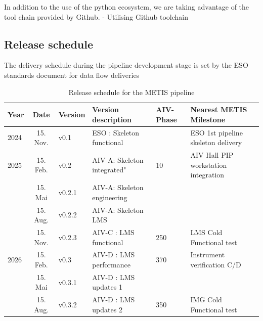 \documentclass[a4paper]{spie}  %
\begin{document}
In addition to the use of the python ecosystem, we are taking advantage of the tool chain provided by Github.
- Utilising Github toolchain

\subsection{Release schedule}
\label{subsec:imp_schedule}

The delivery schedule during the pipeline development stage is set by the ESO standards document for data flow deliveries \cite{1618}

\begin{table}[]
\caption{Release schedule for the METIS pipeline}
\label{tab:pip_releases}
\begin{tabular}{|lcllll|}
\hline
Year & Date & Version & Version description & AIV-Phase & Nearest METIS Milestone          \\
\hline
\hline
{2024}          & 15. Nov.      & v0.1             & ESO : Skeleton functional      &                                        & ESO 1st pipeline skeleton delivery   \\
\hline
{2025}          & 15. Feb.      & v0.2             & AIV-A: Skeleton integrated"    & 10                 & AIV Hall PIP workstation integration \\
                                  & 15. Mai       & v0.2.1           & AIV-A: Skeleton engineering  &                                        &                                      \\
                                  & 15. Aug.      & v0.2.2           & AIV-A: Skeleton LMS           &                                        &                                      \\
                                  & 15. Nov.      & v0.2.3           & AIV-C : LMS functional       & {250}                & LMS Cold Functional test             \\
\hline
{2026}          & 15. Feb.      & v0.3             & AIV-D : LMS performance       & {370}                & Instrument verification C/D          \\
                                  & 15. Mai       & v0.3.1           & AIV-D : LMS updates 1         &                                        &                                      \\
                                  & 15. Aug.      & v0.3.2           & AIV-D : LMS updates 2        & {350}                & IMG Cold Functional test             \\

\end{tabular}
\end{table}
\end{document}
